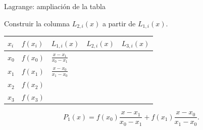 \documentclass[main.tex]{subfiles}
\begin{document}
\begin{frame}[t]{Lagrange: ampliación de la tabla}
\par\noindent\begin{minipage}[t][10mm][t]{\textwidth}\small\strut Construir la columna $L_{2,i}(x)$ a partir de $L_{1,i}(x)$.\end{minipage}\par\nointerlineskip
\begin{minipage}[t]{\textwidth}\begingroup\scriptsize\setlength{\tabcolsep}{3pt}\begin{center}\begin{tabular}{|C{.065\textwidth}|C{.095\textwidth}|C{.19\textwidth}|C{.25\textwidth}|C{.25\textwidth}|}\hline
\rule[-2mm]{0pt}{6mm}$x_i$&$f(x_i)$&$L_{1,i}(x)$&$L_{2,i}(x)$&$L_{3,i}(x)$\\\hline
\rule[-2.5mm]{0pt}{8mm}$x_0$&$f(x_0)$&$\frac{x-x_1}{x_0-x_1}$&&\\\hline
\rule[-2.5mm]{0pt}{8mm}$x_1$&$f(x_1)$&$\frac{x-x_0}{x_1-x_0}$&&\\\hline
\rule[-2.5mm]{0pt}{8mm}$x_2$&$f(x_2)$&&&\\\hline
\rule[-2.5mm]{0pt}{8mm}$x_3$&$f(x_3)$&&&\\\hline
\end{tabular}\end{center}\endgroup\par
\end{minipage}\par\[P_1(x)=f(x_0)\frac{x-x_1}{x_0-x_1}+f(x_1)\frac{x-x_0}{x_1-x_0}.\]
\end{frame}
\end{document}
